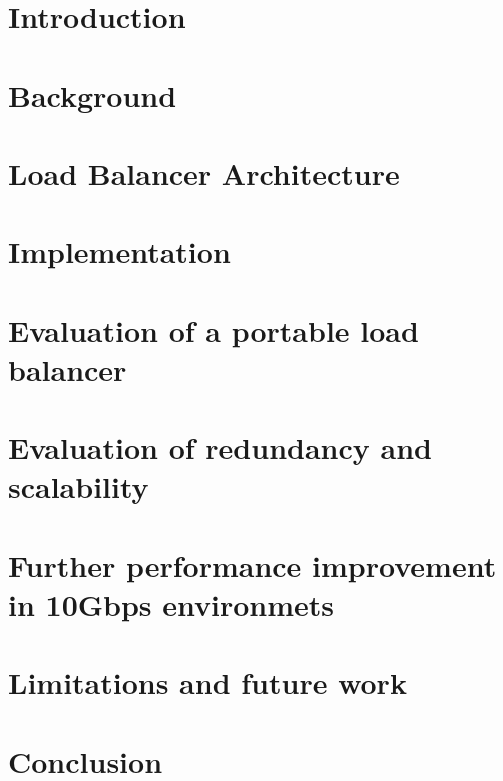 
\graphicspath{{Manuscript/}}

\chapter{Introduction}\label{chapter:introduction}


\chapter{Background}\label{chapter:background}



\chapter{Load Balancer Architecture}\label{chapter:architecture}


\chapter{Implementation}\label{chapter:implemetation}


\chapter{Evaluation of a portable load balancer}\label{chapter:portablelb}


\chapter{Evaluation of redundancy and scalability}\label{chapter:redundancy}


\chapter{Further performance improvement in 10Gbps environmets}\label{chapter:performance}


\chapter{Limitations and future work}\label{chapter:futurework}


\chapter{Conclusion}\label{chapter:conclusion}

%


